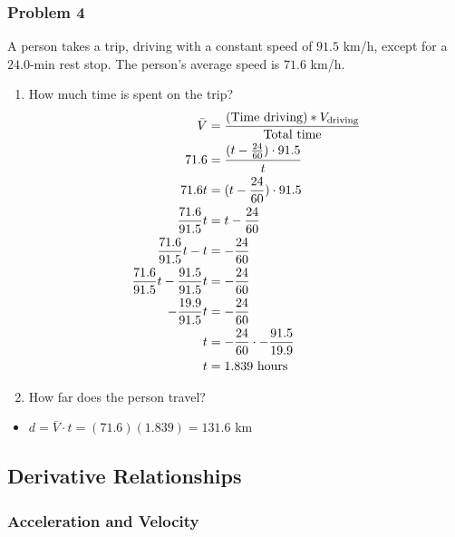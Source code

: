 \documentclass[
  letterpaper,
  DIV=11,
  numbers=noendperiod]{scrartcl}
\providecommand{\tightlist}{%
  \setlength{\itemsep}{0pt}\setlength{\parskip}{0pt}}\usepackage{longtable,booktabs,array}
\begin{document}
\newpage{}

\hypertarget{problem-4}{%
\subsubsection{Problem 4}\label{problem-4}}

A person takes a trip, driving with a constant speed of \(91.5\) km/h,
except for a \(24.0\)-min rest stop. The person's average speed is
\(71.6\) km/h.

\begin{enumerate}
\def\labelenumi{(\alph{enumi})}
\tightlist
\item
  How much time is spent on the trip? \begin{align*}
  \bar{V} &= \frac{(\text{Time driving})*V_\text{driving}}{\text{Total time}} \\
  71.6 &= \cfrac{(t-\frac{24}{60})\cdot 91.5}{t} \\
  71.6t &= (t-\frac{24}{60})\cdot 91.5 \\
  \frac{71.6}{91.5}t &= t-\frac{24}{60} \\
  \frac{71.6}{91.5}t - t &= -\frac{24}{60} \\
  \frac{71.6}{91.5}t - \frac{91.5}{91.5}t &= -\frac{24}{60} \\
  -\frac{19.9}{91.5}t &= -\frac{24}{60} \\
  t &= -\frac{24}{60}\cdot -\frac{91.5}{19.9} \\
  t &= 1.839 \text{ hours}
  \end{align*}
\item
  How far does the person travel?
\end{enumerate}

\begin{itemize}
\tightlist
\item
  \(d = \bar{V}\cdot t = (71.6)(1.839) = 131.6\) km
\end{itemize}

\newpage{}

\hypertarget{derivative-relationships}{%
\subsection{Derivative Relationships}\label{derivative-relationships}}

\hypertarget{acceleration-and-velocity}{%
\subsubsection{Acceleration and
Velocity}\label{acceleration-and-velocity}}
\end{document}
